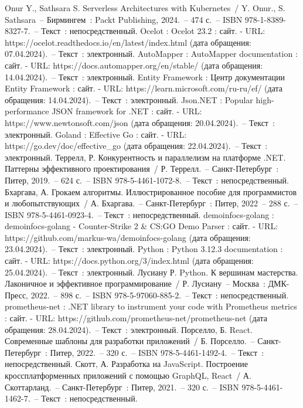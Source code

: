 \begin{thebibliography}{9}
    	Onur Y., Sathsara S. Serverless Architectures with Kubernetes~/ Y. Onur., S. Sathsara~– Бирмингем~: Packt Publishing, 2024.~– 474 с.~– ISBN 978-1-8389-8327-7.~– Текст~: непосредственный.
	 Ocelot : Ocelot 23.2 : сайт. - URL: https://ocelot.readthedocs.io/en/latest/index.html (дата обращения: 07.04.2024).~– Текст~: электронный.
	 AutoMapper : AutoMapper documentation : сайт. - URL: https://docs.automapper.org/en/stable/ (дата обращения: 14.04.2024).~– Текст~: электронный.
	 Entity Framework : Центр документации Entity Framework : сайт. - URL: https://learn.microsoft.com/ru-ru/ef/ (дата обращения: 14.04.2024).~– Текст~: электронный.
	 Json.NET : Popular high-performance JSON framework for .NET : сайт. - URL: https://www.newtonsoft.com/json (дата обращения: 20.04.2024).~– Текст~: электронный.
	 Goland : Effective Go : сайт. - URL: https://go.dev/doc/effective\_go (дата обращения: 22.04.2024).~– Текст~: электронный.
		Террелл, Р. Конкурентность и параллелизм на платформе .NET. Паттерны эффективного проектирования~/ Р. Террелл.~– Санкт-Петербург~: Питер, 2019.~– 624 с.~– ISBN 978-5-4461-1072-8.~– Текст~: непосредственный.
	 Бхаргава, А. Грокаем алгоритмы. Иллюстрированное пособие для программистов и любопытствующих~/ А. Бхаргава.~– Санкт-Петербург~: Питер, 2022~– 288 с.~– ISBN 978-5-4461-0923-4.~– Текст~: непосредственный.
	 demoinfocs-golang : demoinfocs-golang - Counter-Strike 2 \& CS:GO Demo Parser : сайт. - URL: https://github.com/markus-wa/demoinfocs-golang (дата обращения: 23.04.2024).~– Текст~: электронный.
	 Python : Python 3.12.3 documentation : сайт. - URL: https://docs.python.org/3/index.html (дата обращения: 25.04.2024).~– Текст~: электронный.
	 Лусиану Р. Python. К вершинам мастерства. Лаконичное и эффективное программирование~/ Р. Лусиану~– Москва~: ДМК-Пресс, 2022.~– 898 с.~– ISBN 978-5-97060-885-2.~– Текст~: непосредственный.
	 prometheus-net : .NET library to instrument your code with Prometheus metrics : сайт. - URL: https://github.com/prometheus-net/prometheus-net (дата обращения: 28.04.2024).~– Текст~: электронный.
	 Порселло, Б. React. Современные шаблоны для разработки приложений~/ Б. Порселло.~– Санкт-Петербург~: Питер, 2022.~– 320 с.~– ISBN 978-5-4461-1492-4.~– Текст~: непосредственный.
	 Скотт, А. Разработка на JavaScript. Построение кроссплатформенных приложений с помощью GraphQL, React~/ А. Скоттарланд.~– Санкт-Петербург~: Питер, 2021.~– 320 с.~– ISBN 978-5-4461-1462-7.~– Текст~: непосредственный.

\end{thebibliography}
